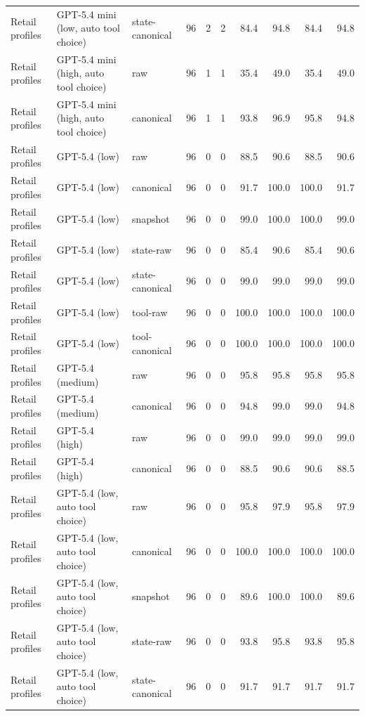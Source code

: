 {\begin{longtable}{lllrrrrrrr}
Retail profiles & GPT-5.4 mini (low, auto tool choice) & state-canonical & 96 & 2 & 2 & 84.4 & 94.8 & 84.4 & 94.8 \\
Retail profiles & GPT-5.4 mini (high, auto tool choice) & raw & 96 & 1 & 1 & 35.4 & 49.0 & 35.4 & 49.0 \\
Retail profiles & GPT-5.4 mini (high, auto tool choice) & canonical & 96 & 1 & 1 & 93.8 & 96.9 & 95.8 & 94.8 \\
Retail profiles & GPT-5.4 (low) & raw & 96 & 0 & 0 & 88.5 & 90.6 & 88.5 & 90.6 \\
Retail profiles & GPT-5.4 (low) & canonical & 96 & 0 & 0 & 91.7 & 100.0 & 100.0 & 91.7 \\
Retail profiles & GPT-5.4 (low) & snapshot & 96 & 0 & 0 & 99.0 & 100.0 & 100.0 & 99.0 \\
Retail profiles & GPT-5.4 (low) & state-raw & 96 & 0 & 0 & 85.4 & 90.6 & 85.4 & 90.6 \\
Retail profiles & GPT-5.4 (low) & state-canonical & 96 & 0 & 0 & 99.0 & 99.0 & 99.0 & 99.0 \\
Retail profiles & GPT-5.4 (low) & tool-raw & 96 & 0 & 0 & 100.0 & 100.0 & 100.0 & 100.0 \\
Retail profiles & GPT-5.4 (low) & tool-canonical & 96 & 0 & 0 & 100.0 & 100.0 & 100.0 & 100.0 \\
Retail profiles & GPT-5.4 (medium) & raw & 96 & 0 & 0 & 95.8 & 95.8 & 95.8 & 95.8 \\
Retail profiles & GPT-5.4 (medium) & canonical & 96 & 0 & 0 & 94.8 & 99.0 & 99.0 & 94.8 \\
Retail profiles & GPT-5.4 (high) & raw & 96 & 0 & 0 & 99.0 & 99.0 & 99.0 & 99.0 \\
Retail profiles & GPT-5.4 (high) & canonical & 96 & 0 & 0 & 88.5 & 90.6 & 90.6 & 88.5 \\
Retail profiles & GPT-5.4 (low, auto tool choice) & raw & 96 & 0 & 0 & 95.8 & 97.9 & 95.8 & 97.9 \\
Retail profiles & GPT-5.4 (low, auto tool choice) & canonical & 96 & 0 & 0 & 100.0 & 100.0 & 100.0 & 100.0 \\
Retail profiles & GPT-5.4 (low, auto tool choice) & snapshot & 96 & 0 & 0 & 89.6 & 100.0 & 100.0 & 89.6 \\
Retail profiles & GPT-5.4 (low, auto tool choice) & state-raw & 96 & 0 & 0 & 93.8 & 95.8 & 93.8 & 95.8 \\
Retail profiles & GPT-5.4 (low, auto tool choice) & state-canonical & 96 & 0 & 0 & 91.7 & 91.7 & 91.7 & 91.7 \\

\end{longtable}}
